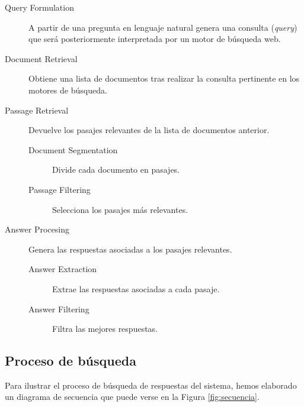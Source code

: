 \documentclass[12pt,a4paper,titlepage]{article}
\begin{document}
\begin{description}
	\item[Query Formulation] A partir de una pregunta en lenguaje natural genera una consulta (\emph{query}) que será posteriormente interpretada por un motor de búsqueda web.
	\item[Document Retrieval] Obtiene una lista de documentos tras realizar la consulta pertinente en los motores de búsqueda. 
	\item[Passage Retrieval] Devuelve los pasajes relevantes de la lista de documentos anterior.
		\begin{description}
			\item[Document Segmentation] Divide cada documento en pasajes.
			\item[Passage Filtering] Selecciona los pasajes más relevantes.
		\end{description}
	\item[Answer Procesing] Genera las respuestas asociadas a los pasajes relevantes.
		\begin{description}
			\item[Answer Extraction] Extrae las respuestas asociadas a cada pasaje.
			\item[Answer Filtering]	Filtra las mejores respuestas.
		\end{description}
\end{description}

\subsection{Proceso de búsqueda}
Para ilustrar el proceso de búsqueda de respuestas del sistema, hemos elaborado un diagrama de secuencia que puede verse en la Figura \ref{fig:secuencia}.
\end{document}
